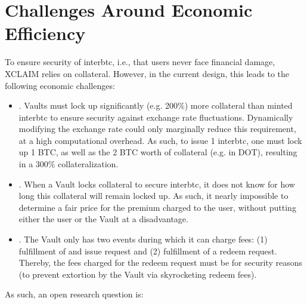 \documentclass[a4paper,10pt,english]{sphinxmanual}
\begin{document}
\section{Challenges Around Economic Efficiency}
\label{\detokenize{economics/fees:challenges-around-economic-efficiency}}
To ensure security of interbtc, i.e., that users never face financial damage, XCLAIM relies on collateral. However, in the current design, this leads to the following economic challenges:
\begin{itemize}
\item {} 
. Vaults must lock up significantly (e.g. 200\%) more collateral than minted interbtc to ensure security against exchange rate fluctuations. Dynamically modifying the exchange rate could only marginally reduce this requirement, at a high computational overhead. As such, to issue 1 interbtc, one must lock up 1 BTC, as well as the 2 BTC worth of collateral (e.g. in DOT), resulting in a 300\% collateralization.

\item {} 
. When a Vault locks collateral to secure interbtc, it does not know for how long this collateral will remain locked up. As such, it nearly impossible to determine a fair price for the premium charged to the user, without putting either the user or the Vault at a disadvantage.

\item {} 
. The Vault only has two events during which it can charge fees: (1) fulfillment of and issue request and (2) fulfillment of a redeem request. Thereby, the fees charged for the redeem request must be  for security reasons (to prevent extortion by the Vault via sky\sphinxhyphen{}rocketing redeem fees).

\end{itemize}

As such, an open research question is:

\end{document}
